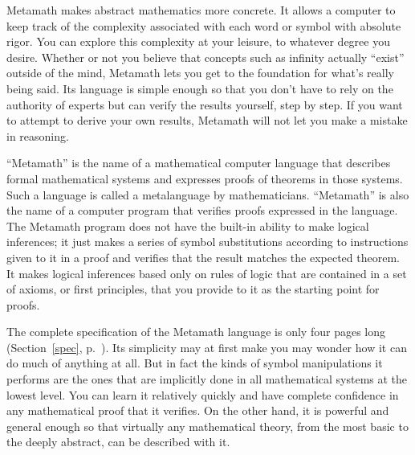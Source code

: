 Metamath makes abstract mathematics more concrete.  It allows
a computer to keep track of the complexity associated with each word or symbol
with absolute rigor.  You can explore this complexity at your leisure, to
whatever degree you desire.  Whether or not you believe that concepts such as
infinity actually ``exist'' outside of the mind, Metamath lets you get to the
foundation for what's really being said.  Its language is simple enough so that you
don't have to rely on the authority of experts but can verify the results
yourself, step by step.  If you want to attempt to derive your own results,
Metamath will not let you make a mistake in reasoning.

``Metamath'' is the name of a mathematical computer language
that describes formal mathematical
systems and expresses proofs of theorems in those systems.  Such a language
is called a metalanguage by mathematicians.  ``Metamath''
is also the name of a computer program that verifies
proofs expressed in the language.  The Metamath program does not have
the built-in
ability to make logical inferences; it just makes a series of symbol
substitutions according to instructions given to it in a proof
and verifies that the result matches the expected theorem.  It makes logical
inferences based only on rules of logic that are contained in a set of
axioms, or first principles, that you provide to it as the
starting point for proofs.

The complete specification of the Metamath language is only four pages long
(Section~\ref{spec}, p.~\pageref{spec}).  Its simplicity may at first make you
may wonder how it can do much of anything at all.  But in fact the kinds of
symbol manipulations it performs are the ones that are implicitly done in all
mathematical systems at the lowest level.  You can learn it relatively quickly
and have complete confidence in any mathematical proof that it verifies.  On
the other hand, it is powerful and general enough so that virtually any
mathematical theory, from the most basic to the deeply abstract, can be
described with it.

